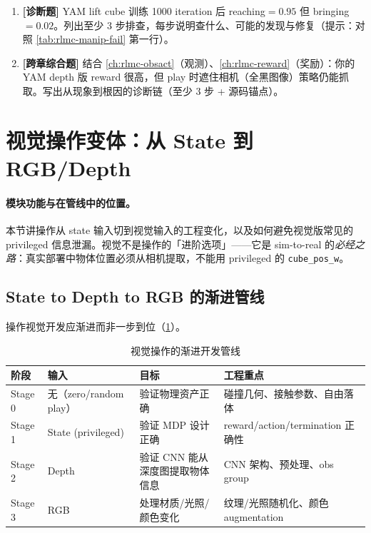 \begin{practice}[本节练习]
\begin{enumerate}
  \item \textbf{[诊断题]} YAM lift cube 训练 1000 iteration 后 reaching$=0.95$ 但 bringing$=0.02$。列出至少 3 步排查，每步说明查什么、可能的发现与修复（提示：对照 \cref{tab:rlmc-manip-fail} 第一行）。
  \item \textbf{[跨章综合题]} 结合 \cref{ch:rlmc-obsact}（观测）、\cref{ch:rlmc-reward}（奖励）：你的 YAM depth 版 reward 很高，但 play 时遮住相机（全黑图像）策略仍能抓取。写出从现象到根因的诊断链（至少 3 步 + 源码锚点）。
\end{enumerate}
\end{practice}

\section{视觉操作变体：从 State 到 RGB/Depth}
\label{sec:rlmc-manip-vision}

\paragraph{模块功能与在管线中的位置。}本节讲操作从 state 输入切到视觉输入的工程变化，以及如何避免视觉版常见的 privileged 信息泄漏。视觉不是操作的「进阶选项」——它是 sim-to-real 的\emph{必经之路}：真实部署中物体位置必须从相机提取，不能用 privileged 的 \verb|cube_pos_w|。

\subsection{State to Depth to RGB 的渐进管线}
\label{sec:rlmc-manip-progressive}

操作视觉开发应渐进而非一步到位（\cref{tab:rlmc-manip-stages-vision}）。

\begin{table}[ht]
\centering
\small
\caption{视觉操作的渐进开发管线}
\label{tab:rlmc-manip-stages-vision}
\begin{tabular}{@{}llll@{}}
\toprule
阶段 & 输入 & 目标 & 工程重点 \\
\midrule
Stage 0 & 无（zero/random play） & 验证物理资产正确 & 碰撞几何、接触参数、自由落体 \\
Stage 1 & State (privileged) & 验证 MDP 设计正确 & reward/action/termination 正确性 \\
Stage 2 & Depth & 验证 CNN 能从深度图提取物体信息 & CNN 架构、预处理、obs group \\
Stage 3 & RGB & 处理材质/光照/颜色变化 & 纹理/光照随机化、颜色 augmentation \\
\bottomrule
\end{tabular}
\end{table}

